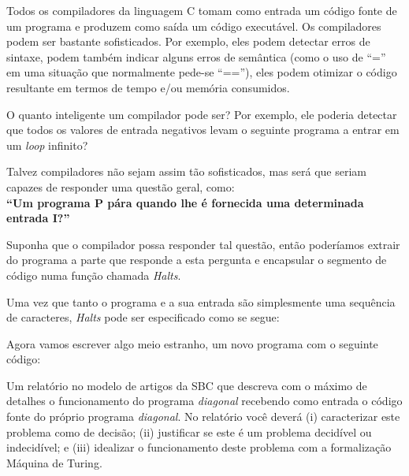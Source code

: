 Todos os compiladores da linguagem C tomam como entrada um código fonte de um
programa e produzem como saída um código executável.
Os compiladores podem ser bastante sofisticados. Por exemplo, eles
podem detectar erros de sintaxe, podem também indicar alguns erros de
semântica (como o uso de ``='' em uma situação que normalmente pede-se ``==''),
eles podem otimizar o código resultante em termos de tempo e/ou memória consumidos.

O quanto inteligente um compilador pode ser?
Por exemplo, ele poderia detectar que todos os valores de entrada negativos
levam o seguinte programa a entrar em um \textit{loop} infinito?



Talvez compiladores não sejam assim tão sofisticados, mas será
que seriam capazes de responder uma questão geral, como:
\\ \textbf{``Um programa P pára quando
lhe é fornecida uma determinada entrada I?''}

Suponha que o compilador possa responder tal questão, então poderíamos extrair
do programa a parte que responde a esta pergunta e
encapsular o segmento de código numa função chamada \textit{Halts}.


Uma vez que tanto o programa e a sua
entrada são simplesmente uma sequência de caracteres, \textit{Halts} pode ser
especificado como se segue:



Agora vamos escrever algo meio estranho, um novo programa com o seguinte código:



Um relatório no modelo de artigos da SBC que descreva com o máximo
de detalhes o funcionamento do programa \textit{diagonal} recebendo como entrada
o código fonte do próprio programa \textit{diagonal}.
No relatório você deverá (i) caracterizar este problema como de decisão;
(ii) justificar se este é um problema decidível ou indecidível; e (iii)
idealizar o funcionamento deste problema com a formalização Máquina de Turing.

